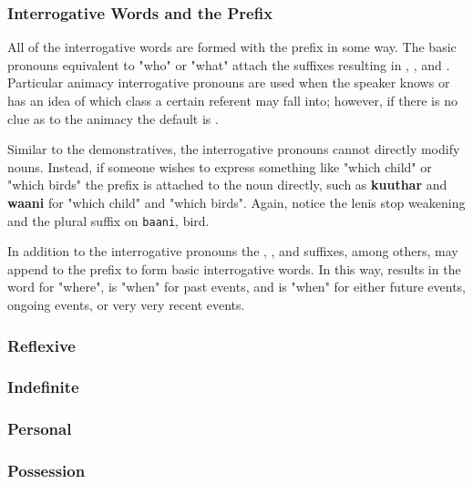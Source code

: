     \subsubsection{Interrogative Words and the \prefixtext{\interrogative} Prefix}
    All of the interrogative words are formed with the \prefixtext{\interrogative} prefix in some way. The basic pronouns equivalent to "who" or "what" attach the suffixes resulting in \textbf{\interrogative\agtsuffix}, \textbf{\interrogative\animsuffix}, and \textbf{\interrogative\inansuffix}. Particular animacy interrogative pronouns are used when the speaker knows or has an idea of which class a certain referent may fall into; however, if there is no clue as to the animacy the default is \textbf{\interrogative\agtsuffix}.
    \par
    Similar to the demonstratives, the interrogative pronouns cannot directly modify nouns. Instead, if someone wishes to express something like "which child" or "which birds" the \prefixtext{\interrogative} prefix is attached to the noun directly, such as \textbf{\interrogative kuuthar} and \textbf{\interrogative waani\animvowelplural} for "which child" and "which birds". Again, notice the lenis stop weakening and the plural suffix on \texttt{baani}, bird.
    \par
    In addition to the interrogative pronouns the \suffixtext{\pastsuffix}, \suffixtext{\nonpastsuffix}, and \suffixtext{\locationsuffix} suffixes, among others, may append to the \prefixtext{\interrogative} prefix to form basic interrogative words. In this way, \textbf{\interrogative\locationsuffix} results in the word for "where", \textbf{\interrogative\pastsuffix} is "when" for past events, and \textbf{\interrogative\nonpastsuffix} is "when" for either future events, ongoing events, or very very recent events.
    \vertspace
    \subsubsection{Reflexive}
    \subsubsection{Indefinite}
    \subsubsection{Personal}
    \subsubsection{Possession}
    


